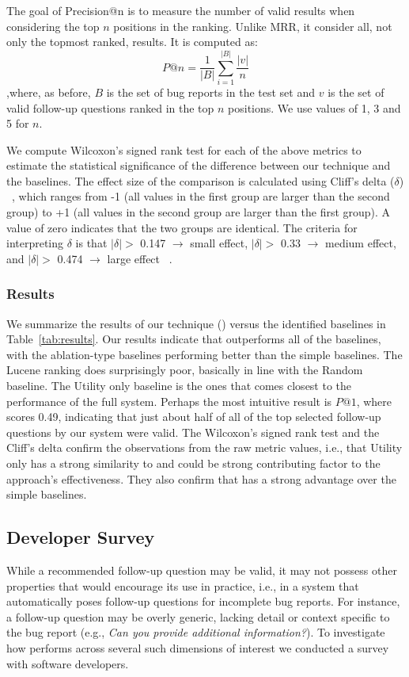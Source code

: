 The goal of Precision@n is to measure the number of valid results when considering the top $n$ positions in the ranking. Unlike MRR, it consider all, not only the topmost ranked, results. It is computed as: $$P@n = \frac{1}{|B|} \sum_{i=1}^{|B|} \frac{|v|}{n}$$ ,where, as before, $B$ is the set of bug reports in the test set and $v$ is the set of valid follow-up questions ranked in the top $n$ positions. We use values of 1, 3 and 5 for $n$.

We compute Wilcoxon's signed rank test for each of the above metrics to estimate the statistical significance of the difference between our technique \evpi and the baselines. The effect size of the comparison is calculated using Cliff's delta ($\delta$) ~\cite{cliff1993dominance}, which ranges from -1 (all values in the first group are larger than the second group) to +1 (all values in the second group are larger than the first group). A value of zero indicates that the two groups are identical. The criteria for interpreting $\delta$ is that $|\delta| >$ 0.147 $\rightarrow$ small effect, $|\delta| >$ 0.33 $\rightarrow$ medium effect, and $|\delta| >$ 0.474 $\rightarrow$ large effect ~\cite{romano2006appropriate}.


\subsubsection{Results}
We summarize the results of our technique (\evpi) versus the identified
baselines in Table~\ref{tab:results}. Our results indicate that \evpi outperforms all of the baselines,
with the ablation-type baselines performing better than the simple baselines. The Lucene ranking
does surprisingly poor, basically in line with the Random baseline. The Utility only baseline is
the ones that comes closest to the performance of the full system. Perhaps the most intuitive result
is $P@1$, where \evpi scores 0.49, indicating that just about half of all of the top selected follow-up
questions by our system were valid. The Wilcoxon's signed rank test and the Cliff's delta confirm the observations from
the raw metric values, i.e., that Utility only has a strong similarity to \evpi and could be strong contributing
factor to the approach's effectiveness. They also confirm that \evpi has a strong advantage over the simple
baselines.


\subsection{Developer Survey}
While a recommended follow-up question may be valid, it may not possess other properties that would
encourage its use in practice, i.e., in a system that automatically poses follow-up questions for incomplete bug reports. For
instance, a follow-up question may be overly generic, lacking detail or context specific to the bug report (e.g., {\em Can you provide
additional information?}). To investigate how \evpi performs across several such dimensions of interest we conducted a survey with
software developers.

